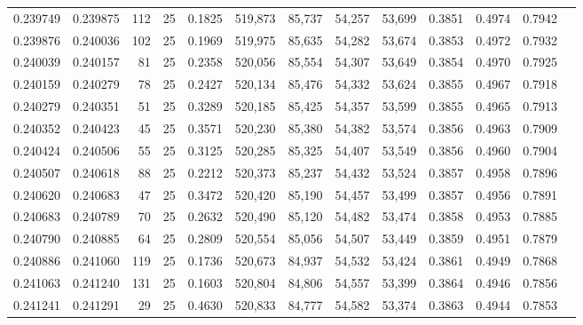 \begin{tabular}{rrrrrrrrrrrrr}
0.239749 & 0.239875 &   112 &  25 &                                     0.1825 & 519,873 &  85,737 &  54,257 &  53,699 & 0.3851 & 0.4974 & 0.7942 \\
0.239876 & 0.240036 &   102 &  25 &                                     0.1969 & 519,975 &  85,635 &  54,282 &  53,674 & 0.3853 & 0.4972 & 0.7932 \\
0.240039 & 0.240157 &    81 &  25 &                                     0.2358 & 520,056 &  85,554 &  54,307 &  53,649 & 0.3854 & 0.4970 & 0.7925 \\
0.240159 & 0.240279 &    78 &  25 &                                     0.2427 & 520,134 &  85,476 &  54,332 &  53,624 & 0.3855 & 0.4967 & 0.7918 \\
0.240279 & 0.240351 &    51 &  25 &                                     0.3289 & 520,185 &  85,425 &  54,357 &  53,599 & 0.3855 & 0.4965 & 0.7913 \\
0.240352 & 0.240423 &    45 &  25 &                                     0.3571 & 520,230 &  85,380 &  54,382 &  53,574 & 0.3856 & 0.4963 & 0.7909 \\
0.240424 & 0.240506 &    55 &  25 &                                     0.3125 & 520,285 &  85,325 &  54,407 &  53,549 & 0.3856 & 0.4960 & 0.7904 \\
0.240507 & 0.240618 &    88 &  25 &                                     0.2212 & 520,373 &  85,237 &  54,432 &  53,524 & 0.3857 & 0.4958 & 0.7896 \\
0.240620 & 0.240683 &    47 &  25 &                                     0.3472 & 520,420 &  85,190 &  54,457 &  53,499 & 0.3857 & 0.4956 & 0.7891 \\
0.240683 & 0.240789 &    70 &  25 &                                     0.2632 & 520,490 &  85,120 &  54,482 &  53,474 & 0.3858 & 0.4953 & 0.7885 \\
0.240790 & 0.240885 &    64 &  25 &                                     0.2809 & 520,554 &  85,056 &  54,507 &  53,449 & 0.3859 & 0.4951 & 0.7879 \\
0.240886 & 0.241060 &   119 &  25 &                                     0.1736 & 520,673 &  84,937 &  54,532 &  53,424 & 0.3861 & 0.4949 & 0.7868 \\
0.241063 & 0.241240 &   131 &  25 &                                     0.1603 & 520,804 &  84,806 &  54,557 &  53,399 & 0.3864 & 0.4946 & 0.7856 \\
0.241241 & 0.241291 &    29 &  25 &                                     0.4630 & 520,833 &  84,777 &  54,582 &  53,374 & 0.3863 & 0.4944 & 0.7853 \\

\end{tabular}

